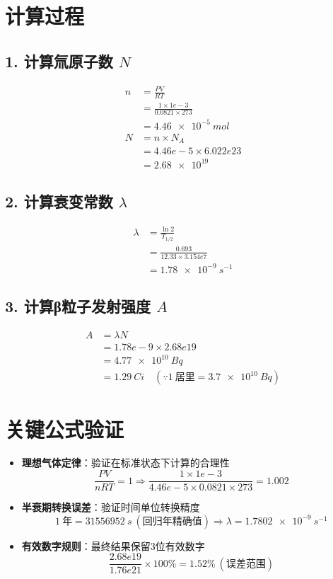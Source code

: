 \documentclass[12pt]{article}
\begin{document}
\section*{计算过程}
\subsection*{1. 计算氚原子数 $ N $}
\begin{align*}
  n &= \frac{PV}{RT} \\
    &= \frac{1 \times 1e-3}{0.0821 \times 273} \\
    &= \SI{4.46e-5}{mol} \\
  N &= n \times N_A \\
    &= 4.46e-5 \times 6.022e23 \\
    &= \SI{2.68e19}{}
\end{align*}

\subsection*{2. 计算衰变常数 $ \lambda $}
\begin{align*}
  \lambda &= \frac{\ln 2}{T_{1/2}} \\
          &= \frac{0.693}{12.33 \times 3.154e7} \\
          &= \SI{1.78e-9}{s^{-1}}
\end{align*}

\subsection*{3. 计算β粒子发射强度 $ A $}
\begin{align*}
  A &= \lambda N \\
    &= 1.78e-9 \times 2.68e19 \\
    &= \SI{4.77e10}{Bq} \\
    &= \SI{1.29}{Ci} \quad (\because 1\ \text{居里} = \SI{3.7e10}{Bq})
\end{align*}

\section*{关键公式验证}
\begin{itemize}
  \item \textbf{理想气体定律}：验证在标准状态下计算的合理性
  $$
  \frac{PV}{nRT} = 1 \Rightarrow \frac{1 \times 1e-3}{4.46e-5 \times 0.0821 \times 273} = 1.002
  $$
  
  \item \textbf{半衰期转换误差}：验证时间单位转换精度
  $$
  1\ \text{年} = \SI{31556952}{s} \ (\text{回归年精确值}) \Rightarrow \lambda = \SI{1.7802e-9}{s^{-1}}
  $$
  
  \item \textbf{有效数字规则}：最终结果保留3位有效数字
  $$
  \frac{2.68e19}{1.76e21} \times 100\% = 1.52\% \ (\text{误差范围})
  $$
\end{itemize}
\end{document}
